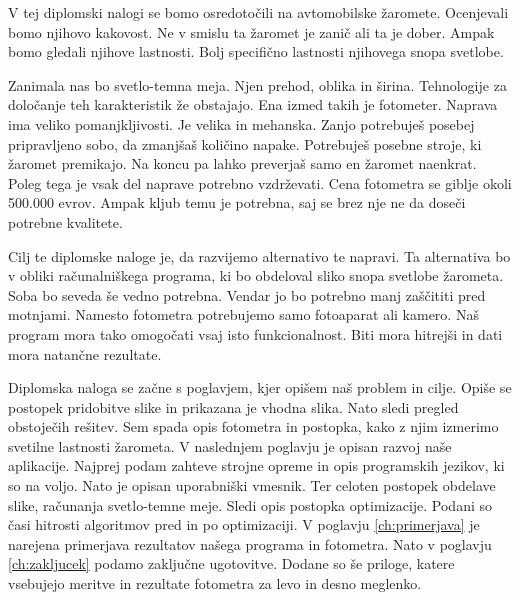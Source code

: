 \documentclass[oneside, a4paper, 12pt]{book}
\begin{document}
V tej diplomski nalogi se bomo osredotočili na avtomobilske žaromete. Ocenjevali bomo njihovo kakovost. Ne v smislu ta žaromet je zanič ali ta je dober. Ampak bomo gledali njihove lastnosti. Bolj specifično lastnosti njihovega snopa svetlobe.

Zanimala nas bo svetlo-temna meja. Njen prehod, oblika in širina. Tehnologije za določanje teh karakteristik že obstajajo. Ena izmed takih je fotometer. Naprava ima veliko pomanjkljivosti. Je velika in mehanska. Zanjo potrebuješ posebej pripravljeno sobo, da zmanjšaš količino napake. Potrebuješ posebne stroje, ki žaromet premikajo. Na koncu pa lahko preverjaš samo en žaromet naenkrat. Poleg tega je vsak del naprave potrebno vzdrževati. Cena fotometra se giblje okoli 500.000 evrov. Ampak kljub temu je potrebna, saj se brez nje ne da doseči potrebne kvalitete.

Cilj te diplomske naloge je, da razvijemo alternativo te napravi. Ta alternativa bo v obliki računalniškega programa, ki bo obdeloval sliko snopa svetlobe žarometa. Soba bo seveda še vedno potrebna. Vendar jo bo potrebno manj zaščititi pred motnjami. Namesto fotometra potrebujemo samo fotoaparat ali kamero. Naš program mora tako omogočati vsaj isto funkcionalnost. Biti mora hitrejši in dati mora natančne rezultate.

Diplomska naloga se začne s poglavjem, kjer opišem naš problem in cilje. Opiše se postopek pridobitve slike in prikazana je vhodna slika. Nato sledi pregled obstoječih rešitev. Sem spada opis fotometra in postopka, kako z njim izmerimo svetilne lastnosti žarometa. V naslednjem poglavju je opisan razvoj naše aplikacije. Najprej podam zahteve strojne opreme in opis programskih jezikov, ki so na voljo. Nato je opisan uporabniški vmesnik. Ter celoten postopek obdelave slike, računanja svetlo-temne meje. Sledi opis postopka optimizacije. Podani so časi hitrosti algoritmov pred in po optimizaciji. V poglavju \ref{ch:primerjava} je narejena primerjava rezultatov našega programa in fotometra. Nato v poglavju \ref{ch:zakljucek} podamo zaključne ugotovitve. Dodane so še priloge, katere vsebujejo meritve in rezultate fotometra za levo in desno meglenko.
\end{document}
